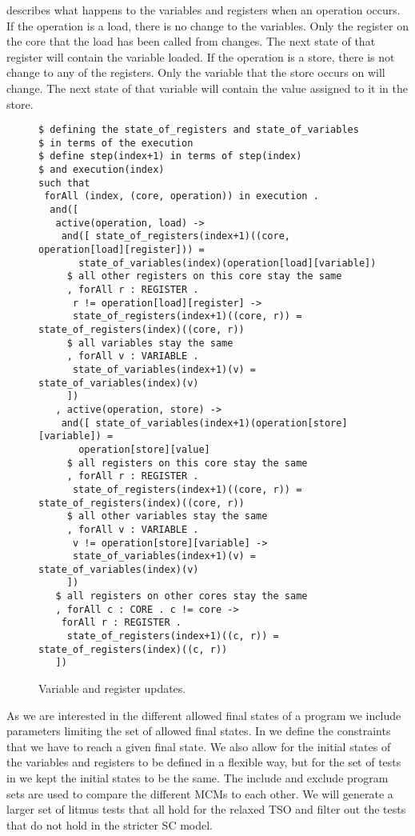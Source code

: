 \documentclass[runningheads]{llncs}
\begin{document}
 describes what happens to the variables and registers when an operation occurs.
If the operation is a load, there is no change to the variables.
Only the register on the core that the load has been called from changes.
The next state of that register will contain the variable loaded.
If the operation is a store, there is not change to any of the registers.
Only the variable that the store occurs on will change.
The next state of that variable will contain the value assigned to it in the store.

\begin{figure}
\begin{lstlisting}
$ defining the state_of_registers and state_of_variables
$ in terms of the execution
$ define step(index+1) in terms of step(index)
$ and execution(index)
such that
 forAll (index, (core, operation)) in execution .
  and([
   active(operation, load) ->
    and([ state_of_registers(index+1)((core, operation[load][register])) =
       state_of_variables(index)(operation[load][variable])
     $ all other registers on this core stay the same
     , forAll r : REGISTER .
      r != operation[load][register] ->
      state_of_registers(index+1)((core, r)) = state_of_registers(index)((core, r))
     $ all variables stay the same
     , forAll v : VARIABLE .
      state_of_variables(index+1)(v) = state_of_variables(index)(v)
     ])
   , active(operation, store) ->
    and([ state_of_variables(index+1)(operation[store][variable]) =
       operation[store][value]
     $ all registers on this core stay the same
     , forAll r : REGISTER .
      state_of_registers(index+1)((core, r)) = state_of_registers(index)((core, r))
     $ all other variables stay the same
     , forAll v : VARIABLE .
      v != operation[store][variable] ->
      state_of_variables(index+1)(v) = state_of_variables(index)(v)
     ])
   $ all registers on other cores stay the same
   , forAll c : CORE . c != core ->
    forAll r : REGISTER .
     state_of_registers(index+1)((c, r)) = state_of_registers(index)((c, r))
   ])
\end{lstlisting}
\caption{Variable and register updates. \label{fig:essence-step2}}
\end{figure}


As we are interested in the different allowed final states of a program we include parameters limiting the set of allowed final states.
In  we define the constraints that we have to reach a given final state.
We also allow for the initial states of the variables and registers to be defined in a flexible way, but for the set of tests in  we kept the initial states to be the same.
The include and exclude program sets are used to compare the different MCMs to each other.
We will generate a larger set of litmus tests that all hold for the relaxed TSO and filter out the tests that do not hold in the stricter SC model.
\end{document}
